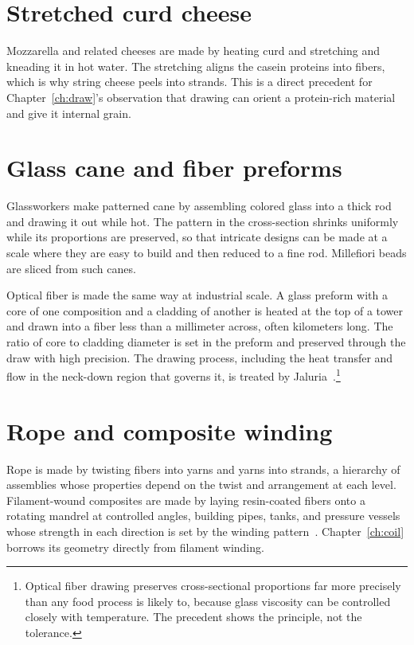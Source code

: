 \documentclass[11pt,openany]{book}
\theoremstyle{definition}
\begin{document}
\section{Stretched curd cheese}

Mozzarella and related cheeses are made by heating curd and stretching and kneading it in hot water. The stretching aligns the casein proteins into fibers, which is why string cheese peels into strands. This is a direct precedent for Chapter~\ref{ch:draw}'s observation that drawing can orient a protein-rich material and give it internal grain.

\section{Glass cane and fiber preforms}

Glassworkers make patterned cane by assembling colored glass into a thick rod and drawing it out while hot. The pattern in the cross-section shrinks uniformly while its proportions are preserved, so that intricate designs can be made at a scale where they are easy to build and then reduced to a fine rod. Millefiori beads are sliced from such canes.

Optical fiber is made the same way at industrial scale. A glass preform with a core of one composition and a cladding of another is heated at the top of a tower and drawn into a fiber less than a millimeter across, often kilometers long. The ratio of core to cladding diameter is set in the preform and preserved through the draw with high precision. The drawing process, including the heat transfer and flow in the neck-down region that governs it, is treated by Jaluria~\cite{jaluria2018}.\footnote{Optical fiber drawing preserves cross-sectional proportions far more precisely than any food process is likely to, because glass viscosity can be controlled closely with temperature. The precedent shows the principle, not the tolerance.}

\section{Rope and composite winding}

Rope is made by twisting fibers into yarns and yarns into strands, a hierarchy of assemblies whose properties depend on the twist and arrangement at each level. Filament-wound composites are made by laying resin-coated fibers onto a rotating mandrel at controlled angles, building pipes, tanks, and pressure vessels whose strength in each direction is set by the winding pattern~\cite{peters2011}. Chapter~\ref{ch:coil} borrows its geometry directly from filament winding.
\end{document}
